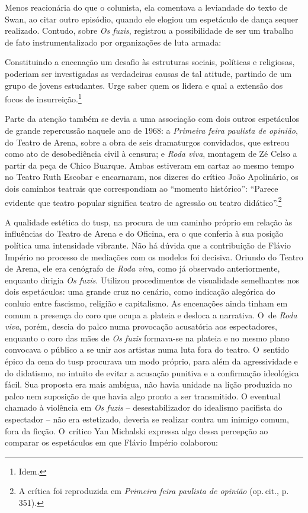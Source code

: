 {Menos reacionária do que o colunista, ela comentava a leviandade do
texto de Swan, ao citar outro episódio, quando ele elogiou um
espetáculo de dança sequer realizado. Contudo, sobre {\it Os fuzis},
registrou a possibilidade de ser um trabalho de fato instrumentalizado
por organizações de luta armada:

\startblockquote
Constituindo a encenação um desafio às estruturas sociais, políticas e
religiosas, poderiam ser investigadas as verdadeiras causas de tal
atitude, partindo de um grupo de jovens estudantes. Urge saber quem os
lidera e qual a extensão dos focos de insurreição.\footnote{Idem.}
\stopblockquote

Parte da atenção também se devia a uma associação com dois outros
espetáculos de grande repercussão naquele ano de 1968: a {\it Primeira
feira paulista de opinião}, do Teatro de Arena, sobre a obra de seis
dramaturgos convidados, que estreou como ato de desobediência civil à
censura; e {\it Roda viva}, montagem de Zé Celso a partir da peça de
Chico Buarque. Ambas estiveram em cartaz ao mesmo tempo no Teatro Ruth
Escobar e encarnaram, nos dizeres do crítico João Apolinário, os dois
caminhos teatrais que correspondiam ao “momento histórico”: “Parece
evidente que teatro popular significa teatro de agressão ou teatro
didático”.\footnote{A crítica foi reproduzida em
  {\it Primeira feira paulista de opinião} (op.\,cit., p.\,351).}

A qualidade estética do {\sc tusp}, na procura de um caminho próprio em
relação às influências do Teatro de Arena e do Oficina, era o que
conferia à sua posição política uma intensidade vibrante. Não há dúvida
que a contribuição de Flávio Império no processo de mediações com os
modelos foi decisiva. Oriundo do Teatro de Arena, ele era cenógrafo de
{\it Roda viva}, como já observado anteriormente, enquanto dirigia {\it Os
fuzis}. Utilizou procedimentos de visualidade semelhantes nos dois
espetáculos: uma grande cruz no cenário, como indicação alegórica do
conluio entre fascismo, religião e capitalismo. As encenações ainda
tinham em comum a presença do coro que ocupa a plateia e desloca a
narrativa. O~de {\it Roda viva}, porém, descia do palco numa provocação
acusatória aos espectadores, enquanto o coro das mães de {\it Os fuzis}
formava-se na plateia e no mesmo plano convocava o público a se unir aos
artistas numa luta fora do teatro. O~sentido épico da cena do {\sc tusp}
procurava um modo próprio, para além da agressividade e do didatismo, no
intuito de evitar a acusação punitiva e a confirmação ideológica fácil.
Sua proposta era mais ambígua, não havia unidade na lição produzida no
palco nem suposição de que havia algo pronto a ser transmitido. O
eventual chamado à violência em {\it Os fuzis} -- desestabilizador do
idealismo pacifista do espectador -- não era estetizado, deveria se
realizar contra um inimigo comum, fora da ficção. O~crítico Yan
Michalski expressa algo dessa percepção ao comparar os espetáculos em
que Flávio Império colaborou:

}
